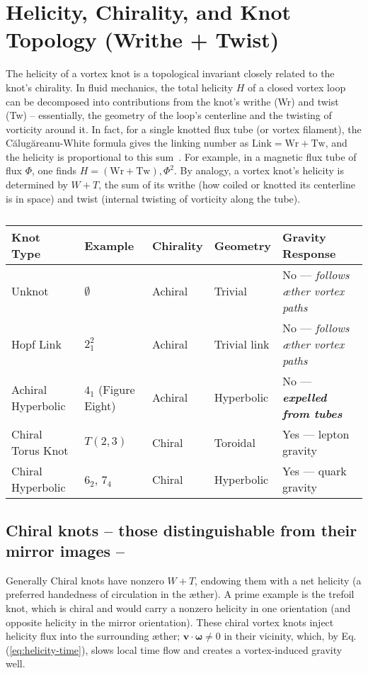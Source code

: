 \usepackage[utf8]{inputenc}
\usepackage[T1]{fontenc}
\section*{Helicity, Chirality, and Knot Topology (Writhe + Twist)}

The helicity of a vortex knot is a topological invariant closely related to the knot's chirality. In fluid mechanics, the total helicity $H$ of a closed vortex loop can be decomposed into contributions from the knot's writhe (Wr) and twist (Tw) -- essentially, the geometry of the loop's centerline and the twisting of vorticity around it. In fact, for a single knotted flux tube (or vortex filament), the Călugăreanu-White formula gives the linking number as $\text{Link} = \text{Wr} + \text{Tw}$, and the helicity is proportional to this sum~\cite{knot_theroy_in_fluid}. For example, in a magnetic flux tube of flux $\Phi$, one finds $H = (\text{Wr} + \text{Tw}),\Phi^2$\cite{knot_theroy_in_fluid}. By analogy, a vortex knot's helicity is determined by $W+T$, the sum of its writhe (how coiled or knotted its centerline is in space) and twist (internal twisting of vorticity along the tube)\cite{knot_theroy_in_fluid}.

\begin{table}[H]
    \centering
    \begin{tabular}{lllll}
        \toprule
        \textbf{Knot Type} & \textbf{Example} & \textbf{Chirality} & \textbf{Geometry} & \textbf{Gravity Response} \\
        \midrule
        Unknot & $\emptyset$ & Achiral & Trivial & No — \textit{follows æther vortex paths} \\
        Hopf Link & $2_1^2$ & Achiral & Trivial link & No — \textit{follows æther vortex paths} \\
        Achiral Hyperbolic & $4_1$ (Figure Eight) & Achiral & Hyperbolic & No — \textit{\textbf{expelled from tubes}} \\
        Chiral Torus Knot & $T(2,3)$ & Chiral & Toroidal & Yes — lepton gravity \\
        Chiral Hyperbolic & $6_2$, $7_4$ & Chiral & Hyperbolic & Yes — quark gravity \\
        \bottomrule
    \end{tabular}
    \caption{}
    \label{tab:knot_classification}
\end{table}


\subsection*{Chiral knots -- those distinguishable from their mirror images -- }
Generally Chiral knots have nonzero $W+T$, endowing them with a net helicity (a preferred handedness of circulation in the \ae ther). A prime example is the trefoil knot, which is chiral and would carry a nonzero helicity in one orientation (and opposite helicity in the mirror orientation). These chiral vortex knots inject helicity flux into the surrounding \ae ther; $\mathbf{v}\cdot\boldsymbol{\omega}\neq 0$ in their vicinity, which, by Eq.(\ref{eq:helicity-time}), slows local time flow and creates a vortex-induced gravity well.

